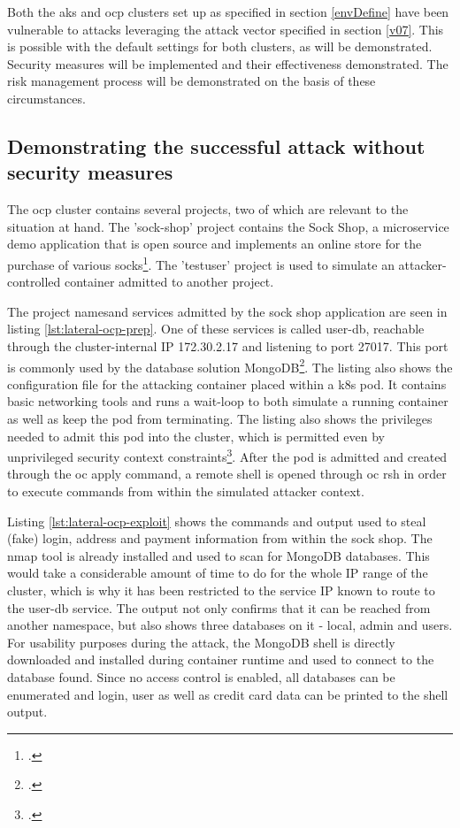Both the \gls{aks} and \gls{ocp} clusters set up as specified in section \ref{envDefine} have been vulnerable to attacks leveraging the attack vector specified in section \ref{v07}. This is possible with the default settings for both clusters, as will be demonstrated. Security measures will be implemented and their effectiveness demonstrated. The risk management process will be demonstrated on the basis of these circumstances.

\subsection{Demonstrating the successful attack without security measures}
The \gls{ocp} cluster contains several projects, two of which are relevant to the situation at hand. 
The 'sock-shop' project contains the Sock Shop, a microservice demo application that is open source and implements an online store for the purchase of various socks\footcite[][, first paragraph of 'README.md']{sockShop}.
The 'testuser' project is used to simulate an attacker-controlled container admitted to another project.

The project namesand  services admitted by the sock shop application are seen in listing \ref{lst:lateral-ocp-prep}. One of these services is called user-db, reachable through the cluster-internal IP 172.30.2.17 and listening to port 27017. This port is commonly used by the database solution MongoDB\footcite[][, first table row]{mongoPort}. The listing also shows the configuration file for the attacking container placed within a \gls{k8s} pod. It contains basic networking tools and runs a wait-loop to both simulate a running container as well as keep the pod from terminating. The listing also shows the privileges needed to admit this pod into the cluster, which is permitted even by unprivileged security context constraints\footcite[][, refer to table of section 'Listing Security Context Constraints']{sccDefaults}. After the pod is admitted and created through the oc apply command, a remote shell is opened through oc rsh in order to execute commands from within the simulated attacker context.

Listing \ref{lst:lateral-ocp-exploit} shows the commands and output used to steal (fake) login, address and payment information from within the sock shop.
The nmap tool is already installed and used to scan for MongoDB databases. This would take a considerable amount of time to do for the whole IP range of the cluster, which is why it has been restricted to the service IP known to route to the user-db service. The output not only confirms that it can be reached from another namespace, but also shows three databases on it - local, admin and users.
For usability purposes during the attack, the MongoDB shell is directly downloaded and installed during container runtime and used to connect to the database found. Since no access control is enabled, all databases can be enumerated and login, user as well as credit card data can be printed to the shell output.

